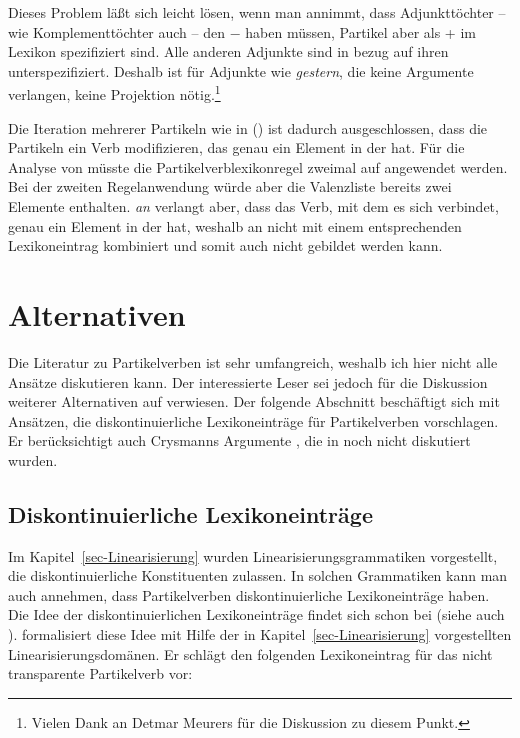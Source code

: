 Dieses Problem läßt sich leicht lösen,
wenn man annimmt, dass Adjunkttöchter -- wie Komplementtöchter auch -- den \lexw{} $-$ haben
müssen, Partikel aber als \lex+ im Lexikon spezifiziert sind. Alle anderen Adjunkte
sind in bezug auf ihren \lexw unterspezifiziert. Deshalb ist für Adjunkte wie \emph{gestern},
die keine Argumente verlangen, keine Projektion nötig.\footnote{
        Vielen Dank an Detmar Meurers für die Diskussion zu diesem Punkt.%
}

Die Iteration mehrerer Partikeln wie in () ist dadurch ausgeschlossen, dass die Partikeln ein
Verb modifizieren, das genau ein Element in der \compsl hat.
\z
Für die Analyse von  müsste die Partikelverblexikonregel zweimal auf 
angewendet werden. Bei der zweiten Regelanwendung würde aber die Valenzliste bereits zwei Elemente
enthalten. \emph{an} verlangt aber, dass das Verb, mit dem es sich verbindet, genau ein Element in
der \compsl hat, weshalb an nicht mit einem entsprechenden Lexikoneintrag kombiniert und
 somit auch nicht gebildet werden kann.

\section{Alternativen}

Die Literatur zu Partikelverben ist sehr umfangreich, weshalb ich hier nicht alle Ansätze diskutieren
kann. Der interessierte Leser sei jedoch für die Diskussion weiterer Alternativen auf
 verwiesen. Der folgende Abschnitt beschäftigt sich mit
Ansätzen, die diskontinuierliche Lexikoneinträge für Partikelverben vorschlagen. Er berücksichtigt
auch Crysmanns Argumente \citeyearpar{Crysmann2002a}, die in  noch nicht
diskutiert wurden.

\subsection{Diskontinuierliche Lexikoneinträge}
\label{sec-disc-entry}

Im Kapitel~\ref{sec-Linearisierung} wurden Linearisierungsgrammatiken vorgestellt, die
diskontinuierliche Konstituenten zulassen. In solchen Grammatiken kann man auch annehmen,
dass Partikelverben diskontinuierliche Lexikoneinträge haben. Die Idee der diskontinuierlichen
Lexikoneinträge findet sich schon bei \citet[]{Wells47a} (siehe auch ).
\citet*[--248]{Kathol95a} formalisiert diese Idee mit Hilfe
der in Kapitel~\ref{sec-Linearisierung} vorgestellten Linearisierungsdomänen.
Er schlägt den folgenden Lexikoneintrag für das nicht transparente Partikelverb  
vor:

